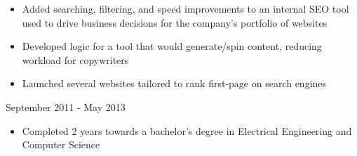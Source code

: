\documentclass{resume}
\begin{document}
\begin{spacing}{1.2}
\begin{paracol}{2}
		\nointerlineskip
		\begin{itemize}
			\item Added searching, filtering, and speed improvements to an internal SEO tool used to drive business decisions for the company’s portfolio of websites
			\item Developed logic for a tool that would generate/spin content, reducing workload for copywriters
			\item Launched several websites tailored to rank first-page on search engines
		\end{itemize}

		\bigskip
		\bigskip

		\small {}

		{\large{}}
		\hfill{\color{subcontent} September 2011 - May 2013}

		\nointerlineskip
		\begin{itemize}
			\item Completed 2 years towards a bachelor's degree in Electrical Engineering and Computer Science
		\end{itemize}
	\end{paracol}
\end{spacing}
\end{document}
